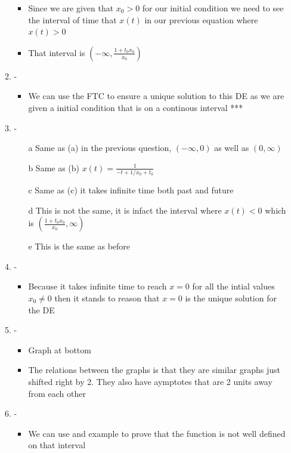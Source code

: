 \documentclass{article}
\begin{document}
\begin{enumerate}
\begin{enumerate}
\begin{itemize}
            \item Since we are given that $x_0 > 0$ for our initial condition we need to see the interval of time that $x(t)$ in our previous equation where $x(t) > 0$
            \item That interval is $(-\infty, \frac{1+t_0x_0}{x_0}) $
        \end{itemize}
        \item - \begin{itemize}
            \item We can use the FTC to ensure a unique solution to this DE as we are given a initial condition that is on a continous interval ***
        \end{itemize}
        \item - \begin{enumerate}
            \item [a] Same as (a) in the previous question, $(-\infty , 0)$ as well as $(0 , \infty)$ 
            \item [b] Same as (b) $x(t) = \frac{1}{-t +1/x_0 + t_0}$
            \item [c] Same as (c) it takes infinite time both past and future
            \item [d] This is not the same, it is infact the interval where $x(t) < 0$ which is $(\frac{1+t_0x_0}{x_0}, \infty) $
            \item [e] This is the same as before
        \end{enumerate}
        \item - \begin{itemize}
            \item Because it takes infinite time to reach $x=0$ for all the intial values $x_0 \ne 0 $ then it stands to reason that $x=0$ is the unique solution for the DE
        \end{itemize}
        \item - \begin{itemize}
            \item Graph at bottom
            \item The relations between the graphs is that they are similar graphs just shifted right by 2. They also have aymptotes that are 2 units away from each other
        \end{itemize}
        \item - \begin{itemize}
            \item We can use and example to prove that the function is not well defined on that interval

\end{itemize}
\end{enumerate}
\end{enumerate}
\end{document}
